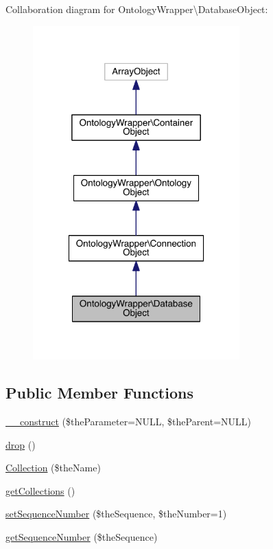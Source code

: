 Collaboration diagram for Ontology\-Wrapper\textbackslash{}Database\-Object\-:
\nopagebreak
\begin{figure}[H]
\begin{center}
\leavevmode
\includegraphics[width=226pt]{class_ontology_wrapper_1_1_database_object__coll__graph}
\end{center}
\end{figure}
\subsection*{Public Member Functions}
\begin{DoxyCompactItemize}
\item 
\hyperlink{class_ontology_wrapper_1_1_database_object_a12746bd4b3a9a869544ccaa06cf3bf34}{\-\_\-\-\_\-construct} (\$the\-Parameter=N\-U\-L\-L, \$the\-Parent=N\-U\-L\-L)
\item 
\hyperlink{class_ontology_wrapper_1_1_database_object_a0a3f541e719b56e1191aaf75a0b58b03}{drop} ()
\item 
\hyperlink{class_ontology_wrapper_1_1_database_object_a58886acb97fd38139340f649f12254a5}{Collection} (\$the\-Name)
\item 
\hyperlink{class_ontology_wrapper_1_1_database_object_a23409291f9aebd68da532a77c5143a84}{get\-Collections} ()
\item 
\hyperlink{class_ontology_wrapper_1_1_database_object_a4c7bd0ce9eb62750ef1c84351ed565cd}{set\-Sequence\-Number} (\$the\-Sequence, \$the\-Number=1)
\item 
\hyperlink{class_ontology_wrapper_1_1_database_object_ab731d606a297f2b1980f457efa1bc80d}{get\-Sequence\-Number} (\$the\-Sequence)
\end{DoxyCompactItemize}
